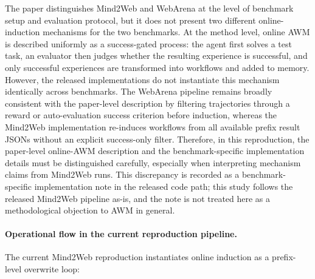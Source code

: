 \documentclass{article}
\begin{document}
The paper distinguishes Mind2Web and WebArena at the level of benchmark
setup and evaluation protocol, but it does not present two different
online-induction mechanisms for the two benchmarks. At the method level,
online AWM is described uniformly as a success-gated process: the agent
first solves a test task, an evaluator then judges whether the resulting
experience is successful, and only successful experiences are
transformed into workflows and added to memory. However, the released
implementations do not instantiate this mechanism identically across
benchmarks. The WebArena pipeline remains broadly consistent with the
paper-level description by filtering trajectories through a reward or
auto-evaluation success criterion before induction, whereas the
Mind2Web implementation re-induces workflows from all available prefix
result JSONs without an explicit success-only filter. Therefore, in this
reproduction, the paper-level online-AWM description and the
benchmark-specific implementation details must be distinguished
carefully, especially when interpreting mechanism claims from Mind2Web
runs. This discrepancy is recorded as a benchmark-specific
implementation note in the released code path; this study follows the
released Mind2Web pipeline as-is, and the note is not treated here as
a methodological objection to AWM in general.

\paragraph{Operational flow in the current reproduction pipeline.}
The current Mind2Web reproduction instantiates online induction as a
prefix-level overwrite loop:
\end{document}
